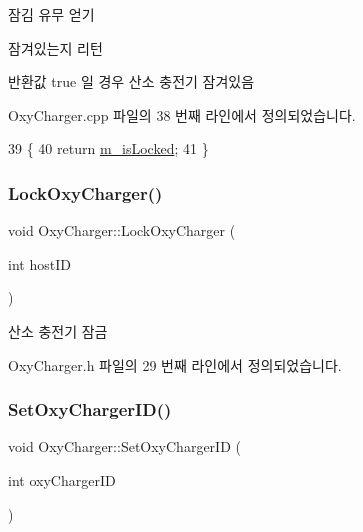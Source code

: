 잠김 유무 얻기 

잠겨있는지 리턴

\begin{DoxyReturn}{반환값}
true 일 경우 산소 충전기 잠겨있음 
\end{DoxyReturn}


Oxy\+Charger.\+cpp 파일의 38 번째 라인에서 정의되었습니다.


\begin{DoxyCode}
39 \{ 
40     \textcolor{keywordflow}{return} \hyperlink{class_oxy_charger_af976be20b7f8cd8cf9c6f59857ba2f48}{m\_isLocked}; 
41 \}
\end{DoxyCode}
\mbox{\label{class_oxy_charger_a5d1f80c23638347ca7d5f9338c3a23b0}} 
\subsubsection{\texorpdfstring{Lock\+Oxy\+Charger()}{LockOxyCharger()}}
{\footnotesize\ttfamily void Oxy\+Charger\+::\+Lock\+Oxy\+Charger (\begin{DoxyParamCaption}\item[{int}]{host\+ID }\end{DoxyParamCaption})\hspace{0.3cm}{\ttfamily [inline]}}



산소 충전기 잠금 



Oxy\+Charger.\+h 파일의 29 번째 라인에서 정의되었습니다.

\mbox{\label{class_oxy_charger_a27f5b27537e10ffb5c140b651de5fa06}} 
\subsubsection{\texorpdfstring{Set\+Oxy\+Charger\+I\+D()}{SetOxyChargerID()}}
{\footnotesize\ttfamily void Oxy\+Charger\+::\+Set\+Oxy\+Charger\+ID (\begin{DoxyParamCaption}\item[{int}]{oxy\+Charger\+ID }\end{DoxyParamCaption})}



